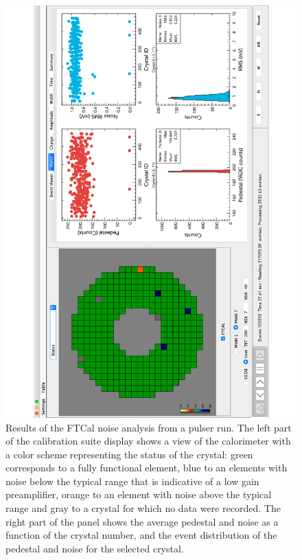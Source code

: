 \begin{figure}
\includegraphics[height=1.0\columnwidth,angle=270]{fig/ftcal_pulserrun.pdf}
\caption{Results of the FTCal noise analysis from a pulser run. The left part of the calibration suite display shows a view of the calorimeter with a color scheme representing the status of the crystal: green corresponds to a fully functional element, blue to an elements with noise below the typical range that is indicative of a low gain preamplifier, orange to an element with noise above the typical range and gray to a crystal for which no data were recorded. The right part of the panel shows the average pedestal and noise as a function of the crystal number, and the event distribution of the pedestal and noise for the selected crystal.}
\label{fig:ftcal_pulserrun}
\end{figure}

